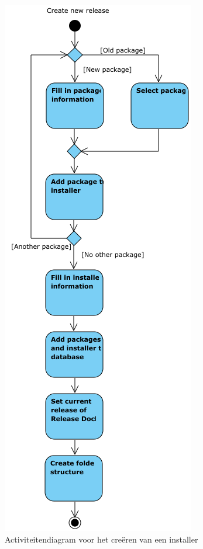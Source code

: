 \begin{figure}[!ht]
\centering
\includegraphics[scale=0.6]{afbeelding/flowcharts/NewRelease.png}
\caption{Activiteitendiagram voor het creëren van een installer}
\label{fig:flow:newRelease}
\end{figure}

